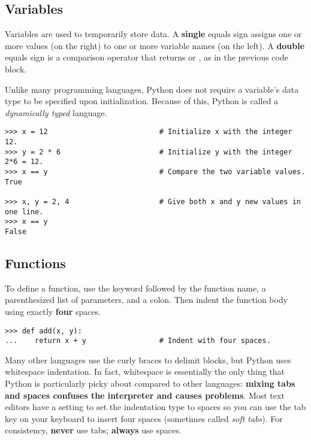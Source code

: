 \subsection*{Variables} %

Variables are used to temporarily store data.
A \textbf{single} equals sign \li{=} assigns one or more values (on the right) to one or more variable names (on the left).
A \textbf{double} equals sign \li{==} is a comparison operator that returns  or , as in the previous code block.

Unlike many programming languages, Python does not require a variable's data type to be specified upon initialization.
Because of this, Python is called a \emph{dynamically typed} language.

\begin{lstlisting}
>>> x = 12                          # Initialize x with the integer 12.
>>> y = 2 * 6                       # Initialize y with the integer 2*6 = 12.
>>> x == y                          # Compare the two variable values.
True

>>> x, y = 2, 4                     # Give both x and y new values in one line.
>>> x == y
False
\end{lstlisting}

\subsection*{Functions} %

To define a function, use the  keyword followed by the function name, a parenthesized list of parameters, and a colon.
Then indent the function body using exactly \textbf{four} spaces.

\begin{lstlisting}
>>> def add(x, y):
...    return x + y                 # Indent with four spaces.
\end{lstlisting}

\begin{warn} %
Many other languages use the curly braces \li{\{\}} to delimit blocks, but Python uses whitespace indentation.
In fact, whitespace is essentially the only thing that Python is particularly picky about compared to other languages: \textbf{mixing tabs and spaces confuses the interpreter and causes problems}.
Most text editors have a setting to set the indentation type to spaces so you can use the tab key on your keyboard to insert four spaces (sometimes called \emph{soft tabs}).
For consistency, \textbf{never} use tabs; \textbf{always} use spaces.
\end{warn}

